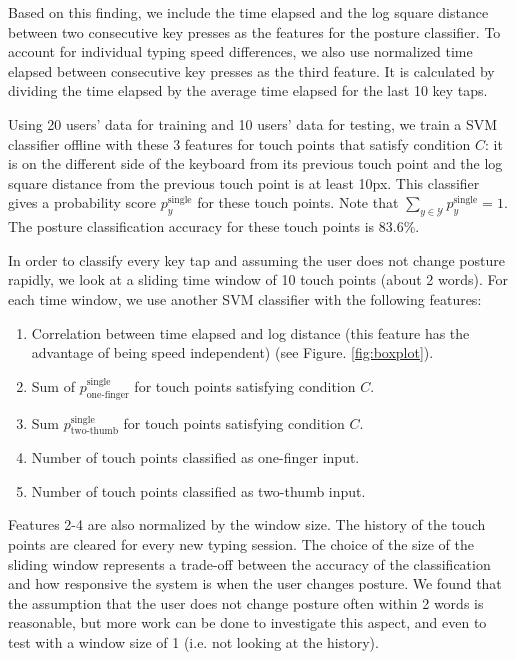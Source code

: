 \documentclass{sigchi}
\begin{document}
Based on this finding, we include the time elapsed and the log square distance
between two consecutive key presses as the features for the posture classifier. 
To account for individual typing speed differences, we also use normalized time 
elapsed between consecutive key presses as the third feature. It is calculated 
by dividing the time elapsed by the average time elapsed for the last 10 key
taps.

Using 20 users’ data for training and 10 users’ data for testing, we train a SVM classifier offline with these 3 features for touch points that satisfy condition $C$: it is 
on the different side of the keyboard from its previous touch point and the log square distance from the previous touch point is at least 10px. This classifier gives a probability score $p_y^{\text{single}}$ for these touch points. Note that $\displaystyle\sum_{y \in \mathcal{Y}}p_y^{\text{single}} = 1$. The posture classification accuracy for these touch points is 83.6\%.
 
In order to classify every key tap and assuming the user does not change posture 
rapidly, we look at a sliding time window of 10 touch points (about 2 words). For 
each time window, we use another SVM classifier with the following features:
\begin{enumerate}
\item Correlation between time elapsed and log distance (this feature has the
advantage of being speed independent) (see Figure. \ref{fig:boxplot}).
\item Sum of $p_\text{one-finger}^{\text{single}}$ for touch points satisfying condition $C$.
\item Sum $p_\text{two-thumb}^{\text{single}}$ for touch points satisfying condition $C$.
\item Number of touch points classified as one-finger input.
\item Number of touch points classified as two-thumb input.
\end{enumerate}
Features 2-4 are also normalized by the window size. The history of the touch points are cleared for every new typing session.
The choice of the size of the sliding window represents a trade-off between the 
accuracy of the classification and how responsive the system is when the user
changes posture. We found that the assumption that the user does not change posture
often within 2 words is reasonable, but more work can be done to investigate this
aspect, and even to test with a window size of 1 (i.e. not 
looking at the history).
\end{document}
